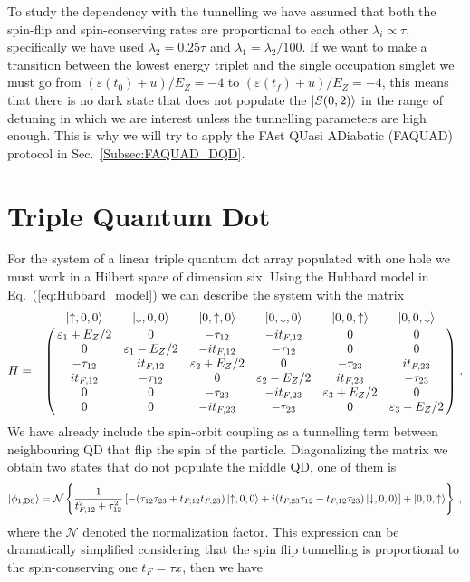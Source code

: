 \documentclass[a4paper,11pt]{article}
\begin{document}
To study the dependency with the tunnelling we have assumed that both the spin-flip and spin-conserving rates are proportional to each other $\lambda_i\propto \tau$, specifically we have used $\lambda_2=0.25\tau$ and $\lambda_1=\lambda_2/100$. If we want to make a transition between the lowest energy triplet and the single occupation singlet we must go from $(\varepsilon(t_0)+u)/E_Z=-4$ to $(\varepsilon(t_f)+u)/E_Z=-4$, this means that there is no dark state that does not populate the $\ket{S(0,2)}$ in the range of detuning in which we are interest unless the tunnelling parameters are high enough. This is why we will try to apply the FAst QUasi ADiabatic (FAQUAD) protocol in Sec.~\ref{Subsec:FAQUAD_DQD}.

\section{Triple Quantum Dot}
For the system of a linear triple quantum dot array populated with one hole we must work in a Hilbert space of dimension six. Using the Hubbard model in Eq.~(\ref{eq:Hubbard_model}) we can describe the system with the matrix
\begin{equation}
H=\bordermatrix{~ & \ket{\uparrow,0,0} & \ket{\downarrow,0,0} & \ket{0,\uparrow,0} & \ket{0,\downarrow,0}& \ket{0,0,\uparrow} & \ket{0,0,\downarrow}\cr
	~ & \varepsilon_1+E_Z/2 & 0 & -\tau_{12} & -it_{F,12} & 0 & 0 \cr
	~ & 0 & \varepsilon_1-E_Z/2 & -it_{F,12} & -\tau_{12} & 0 & 0 \cr
	~ & -\tau_{12} & it_{F,12} & \varepsilon_2+E_Z/2 & 0 & -\tau_{23} & it_{F,23} \cr
	~ & it_{F,12} & -\tau_{12} & 0 & \varepsilon_2-E_Z/2 & it_{F,23} & -\tau_{23} \cr
	~ & 0 & 0 & -\tau_{23} & -it_{F,23} & \varepsilon_3+E_Z/2 & 0 \cr
	~ & 0 & 0 & -it_{F,23} & -\tau_{23} & 0 & \varepsilon_3-E_Z/2 \cr}\; .
\end{equation}
We have already include the spin-orbit coupling as a tunnelling term between neighbouring QD that flip the spin of the particle. Diagonalizing the matrix we obtain two states that do not populate the middle QD, one of them is
\begin{equation}
	\ket{\phi_{1,\text{DS}}}=\mathcal{N}\left\{\frac{1}{t_{F,12}^2+\tau_{12}^2}\left[-(\tau_{12}\tau_{23}+t_{F,12}t_{F,23})\ket{\uparrow,0,0}+i(t_{F,23}\tau_{12}-t_{F,12}\tau_{23})\ket{\downarrow,0,0}\right]+\ket{0,0,\uparrow}\right\}\; ,
\end{equation}
where the $\mathcal{N}$ denoted the normalization factor. This expression can be dramatically simplified considering that the spin flip tunnelling is proportional to the spin-conserving one $t_F=\tau x$, then we have
\end{document}
